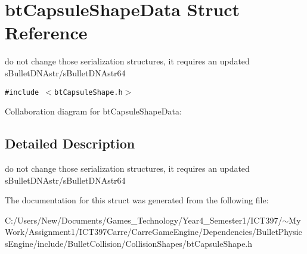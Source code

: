 \hypertarget{structbt_capsule_shape_data}{
\section{btCapsuleShapeData Struct Reference}
\label{structbt_capsule_shape_data}
}
do not change those serialization structures, it requires an updated sBulletDNAstr/sBulletDNAstr64  


{\tt \#include $<$btCapsuleShape.h$>$}

Collaboration diagram for btCapsuleShapeData:

\subsection{Detailed Description}
do not change those serialization structures, it requires an updated sBulletDNAstr/sBulletDNAstr64 

The documentation for this struct was generated from the following file:\begin{CompactItemize}
\item 
C:/Users/New/Documents/Games\_\-Technology/Year4\_\-Semester1/ICT397/$\sim$My Work/Assignment1/ICT397Carre/CarreGameEngine/Dependencies/BulletPhysicsEngine/include/BulletCollision/CollisionShapes/btCapsuleShape.h\end{CompactItemize}
